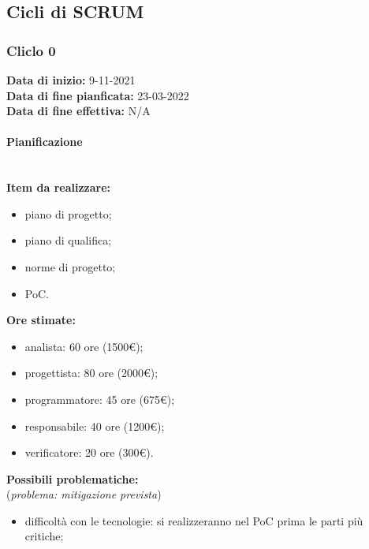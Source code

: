 \documentclass[a4paper, 12pt]{article}
\begin{document}
\subsection{Cicli di SCRUM}
\subsubsection{Cliclo 0}
\textbf{Data di inizio:} 9-11-2021\\
\textbf{Data di fine pianficata:} 23-03-2022\\
\textbf{Data di fine effettiva:} N/A
\paragraph{Pianificazione}\\
\textbf{Item da realizzare:}
\begin{itemize}
\item piano di progetto;
\item piano di qualifica;
\item norme di progetto;
\item PoC.
\end{itemize}
\textbf{Ore stimate:}
\begin{itemize}
\item analista: 60 ore (1500€);
\item progettista: 80 ore (2000€);
\item programmatore: 45 ore (675€);
\item responsabile: 40 ore (1200€);
\item verificatore: 20 ore (300€).
\end{itemize}
\textbf{Possibili problematiche:}\\(\textit{problema: mitigazione prevista})
\begin{itemize}
\item difficoltà con le tecnologie: si realizzeranno nel PoC prima le parti più critiche;
\end{itemize}
\end{document}

